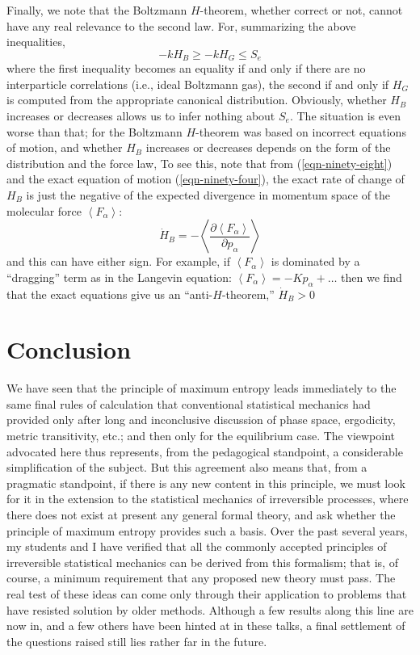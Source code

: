 \documentclass[]{article}
\begin{document}
Finally, we note that the Boltzmann $H$-theorem, whether correct or not, cannot have any real relevance to the second law. For, summarizing the above inequalities,
\begin{equation}
- kH _{ B } \geq- kH _{ G } \leq S _{ e }
\end{equation}
where the first inequality becomes an equality if and only if there are no interparticle correlations (i.e., ideal Boltzmann gas), the second if and only if $H _{ G }$ is computed from the appropriate canonical distribution. Obviously, whether $H _{ B }$ increases or decreases allows us to infer nothing about $S _{ e }$. The situation is even worse than that; for the Boltzmann $H$-theorem was based on incorrect equations of motion, and whether $H _{ B }$ increases or decreases depends on the form of the distribution and the force law, To see this, note that from (\ref{eqn-ninety-eight}) and the exact equation of motion (\ref{eqn-ninety-four}), the exact rate of change of $H _{ B }$ is just the negative of the expected divergence in momentum space of the molecular force $\left\langle F_{\alpha}\right\rangle:$
\begin{equation}
\dot{ H }_{ B }=-\left\langle\frac{\partial\left\langle F _{\alpha}\right\rangle}{\partial p _{\alpha}}\right\rangle
\end{equation}
and this can have either sign. For example, if $\left\langle F _{\alpha}\right\rangle$ is dominated by a ``dragging'' term as in the Langevin equation: $\left\langle F _{\alpha}\right\rangle=- Kp _{\alpha}+ \dots$ then we find that the exact equations give us an ``anti-$H$-theorem,'' $\dot{ H }_{ B }>0$

\section{Conclusion}

We have seen that the principle of maximum entropy leads immediately to the same final rules of calculation that conventional statistical mechanics had provided only after long and inconclusive discussion of phase space, ergodicity, metric transitivity, etc.; and then only for the equilibrium case. The viewpoint advocated here thus represents, from the pedagogical standpoint, a considerable simplification of the subject. But this agreement also means that, from a pragmatic standpoint, if there is any new content in this principle, we must look for it in the extension to the statistical mechanics of irreversible processes, where there does not exist at present any general formal theory, and ask whether the principle of maximum entropy provides such a basis. Over the past several years, my students and I have verified that all the commonly accepted principles of irreversible statistical mechanics can be derived from this formalism; that is, of course, a minimum requirement that any proposed new theory must pass. The real test of these ideas can come only through their application to problems that have resisted solution by older methods. Although a few results along this line are now in,\citep{Heims-theory62} and a few others have been hinted at in these talks, a final settlement of the questions raised still lies rather far in the future.

\end{document}
